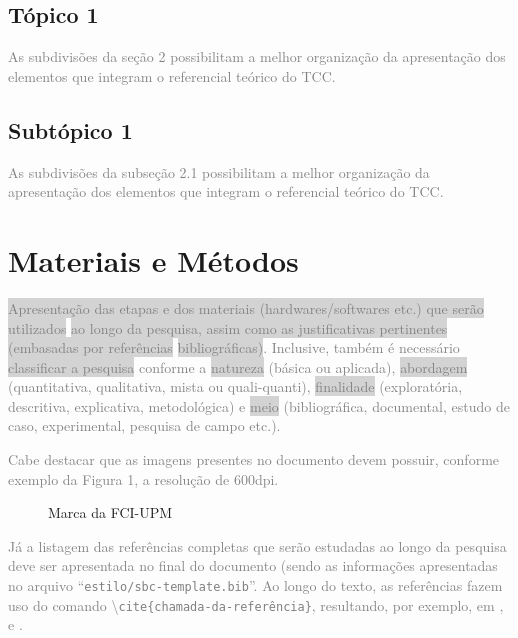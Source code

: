 \documentclass[12pt]{article}
\begin{document}
\subsection{Tópico 1}
\textcolor{gray}{As subdivisões da seção 2 possibilitam a melhor organização da apresentação dos elementos que integram o referencial teórico do TCC.}

\subsection{Subtópico 1}

\textcolor{gray}{As subdivisões da subseção 2.1 possibilitam a melhor organização da apresentação dos elementos que integram o referencial teórico do TCC.}

\section{Materiais e Métodos}
\textcolor{gray}{\colorbox{lightgray}{Apresentação das etapas e dos materiais (hardwares/softwares etc.) que serão utilizados} 
\colorbox{lightgray}{ao longo da pesquisa, assim como as justificativas pertinentes (embasadas por referências} 
\colorbox{lightgray}{bibliográficas)}. Inclusive, também é necessário \colorbox{lightgray}{classificar a pesquisa} conforme a \colorbox{lightgray}{natureza} (básica ou aplicada), \colorbox{lightgray}{abordagem} (quantitativa, qualitativa, mista ou quali-quanti), \colorbox{lightgray}{finalidade} (exploratória, descritiva, explicativa, metodológica) e \colorbox{lightgray}{meio} (bibliográfica, documental, estudo de caso, experimental, pesquisa de campo etc.).}

\textcolor{gray}{Cabe destacar que as imagens presentes no documento devem possuir, conforme exemplo da Figura 1, a resolução de 600dpi.} 

\begin{figure}[h]
\centering

\caption{Marca da FCI-UPM}
\end{figure}

\textcolor{gray}{Já a listagem das referências completas que serão estudadas ao longo da pesquisa deve ser apresentada no final do documento (sendo as informações apresentadas no arquivo ``\texttt{estilo/sbc-template.bib}''. Ao longo do texto, as referências fazem uso do comando  \textbackslash\texttt{cite\{chamada-da-referência\}}, resultando, por exemplo, em \cite{boulic:91}, \cite{smith:99} e \cite{knuth:84}.}
\end{document}
